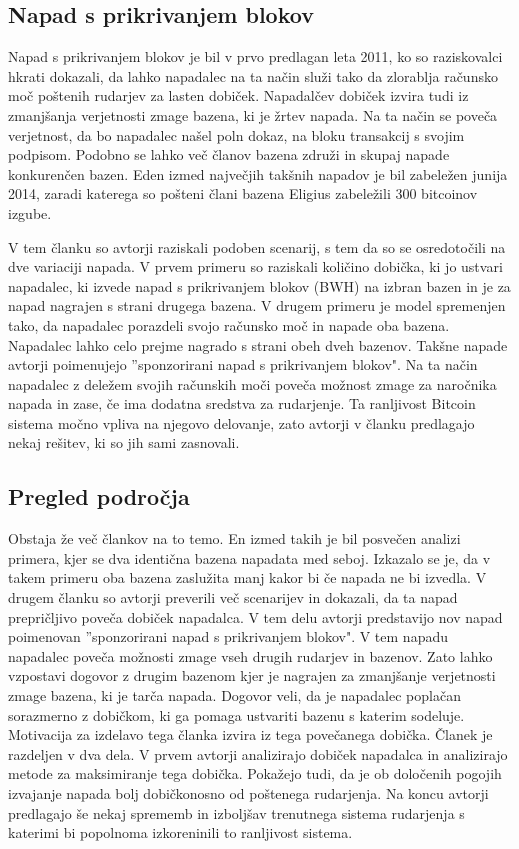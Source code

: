 \documentclass{acm_proc_article-sp}
\begin{document}
\subsection{Napad s prikrivanjem blokov} \label{sekcija2}

Napad s prikrivanjem blokov je bil v prvo predlagan leta 2011, ko so raziskovalci hkrati dokazali, da lahko napadalec na ta način služi tako da zlorablja računsko moč poštenih rudarjev za lasten dobiček. Napadalčev dobiček izvira tudi iz zmanjšanja verjetnosti zmage bazena, ki je žrtev napada. Na ta način se poveča verjetnost, da bo napadalec našel poln dokaz, na bloku transakcij s svojim podpisom. Podobno se lahko več članov bazena združi in skupaj napade konkurenčen bazen. Eden izmed največjih takšnih napadov je bil zabeležen junija 2014, zaradi katerega so pošteni člani bazena Eligius zabeležili 300 bitcoinov izgube.

V tem članku so avtorji raziskali podoben scenarij, s tem da so se osredotočili na dve variaciji napada. V prvem primeru so raziskali količino dobička, ki jo ustvari napadalec, ki izvede napad s prikrivanjem blokov (BWH) na izbran bazen in je za napad nagrajen s strani drugega bazena. V drugem primeru je model spremenjen tako, da napadalec porazdeli svojo računsko moč in napade oba bazena. Napadalec lahko celo prejme nagrado s strani obeh dveh bazenov. Takšne napade avtorji poimenujejo ''sponzorirani napad s prikrivanjem blokov". Na ta način napadalec z deležem svojih računskih moči poveča možnost zmage za naročnika napada in zase, če ima dodatna sredstva za rudarjenje.  Ta ranljivost Bitcoin sistema močno vpliva na njegovo delovanje, zato avtorji v članku predlagajo nekaj rešitev, ki so jih sami zasnovali.

\subsection{Pregled področja}
Obstaja že več člankov na to temo. En izmed takih je bil posvečen analizi primera, kjer se dva identična bazena napadata med seboj. Izkazalo se je, da v takem primeru oba bazena zaslužita manj kakor bi če napada ne bi izvedla. V drugem članku so avtorji preverili več scenarijev in dokazali, da ta napad prepričljivo poveča dobiček napadalca.
V tem delu avtorji predstavijo nov napad poimenovan ''sponzorirani napad s prikrivanjem blokov". V tem napadu napadalec poveča možnosti zmage vseh drugih rudarjev in bazenov. Zato lahko vzpostavi dogovor z drugim bazenom kjer je nagrajen za zmanjšanje verjetnosti zmage bazena, ki je tarča napada. Dogovor veli, da je napadalec poplačan sorazmerno z dobičkom, ki ga pomaga ustvariti bazenu s katerim sodeluje.
Motivacija za izdelavo tega članka izvira iz tega povečanega dobička. Članek je razdeljen v dva dela. V prvem avtorji analizirajo dobiček napadalca in analizirajo metode za maksimiranje tega dobička. Pokažejo tudi, da je ob določenih pogojih izvajanje napada bolj dobičkonosno od poštenega rudarjenja. Na koncu avtorji predlagajo še nekaj sprememb in izboljšav trenutnega sistema rudarjenja s katerimi bi popolnoma izkoreninili to ranljivost sistema.
\end{document}
